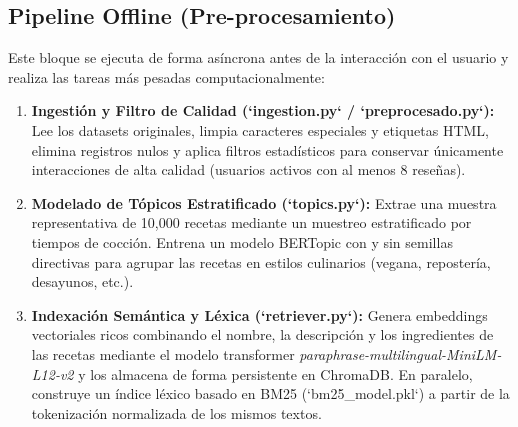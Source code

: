 \documentclass[11pt,a4paper]{article}
\begin{document}
\subsection{Pipeline Offline (Pre-procesamiento)}
Este bloque se ejecuta de forma asíncrona antes de la interacción con el usuario y realiza las tareas más pesadas computacionalmente:
\begin{enumerate}
    \item \textbf{Ingestión y Filtro de Calidad (`ingestion.py` / `preprocesado.py`):} Lee los datasets originales, limpia caracteres especiales y etiquetas HTML, elimina registros nulos y aplica filtros estadísticos para conservar únicamente interacciones de alta calidad (usuarios activos con al menos 8 reseñas).
    \item \textbf{Modelado de Tópicos Estratificado (`topics.py`):} Extrae una muestra representativa de 10,000 recetas mediante un muestreo estratificado por tiempos de cocción. Entrena un modelo BERTopic con y sin semillas directivas para agrupar las recetas en estilos culinarios (vegana, repostería, desayunos, etc.).
    \item \textbf{Indexación Semántica y Léxica (`retriever.py`):} Genera embeddings vectoriales ricos combinando el nombre, la descripción y los ingredientes de las recetas mediante el modelo transformer \textit{paraphrase-multilingual-MiniLM-L12-v2} y los almacena de forma persistente en ChromaDB. En paralelo, construye un índice léxico basado en BM25 (`bm25_model.pkl`) a partir de la tokenización normalizada de los mismos textos.
\end{enumerate}
\end{document}
